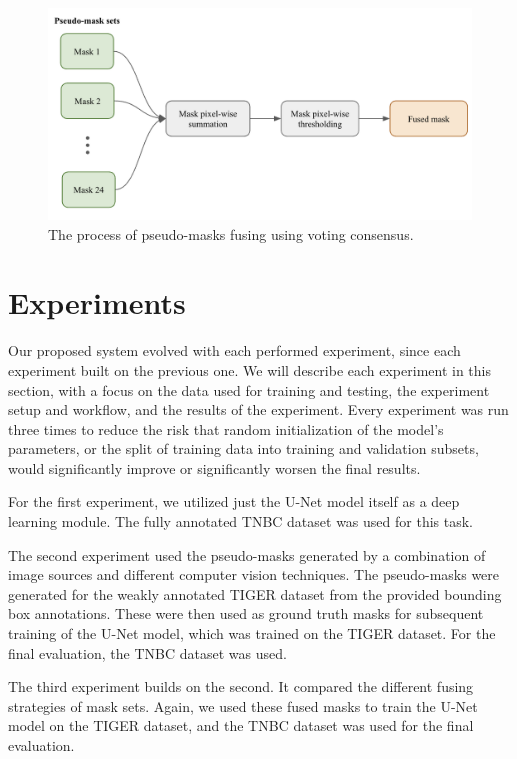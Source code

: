 \begin{figure}[H]
\begin{centering}
\includegraphics[width=\textwidth]{assets/images/for_presentation/dg-mask-fuse-1.png}
\par\end{centering}
\caption{The process of pseudo-masks fusing using voting consensus. 
\label{fig:dg-mask-fuse-1}}
\end{figure}

\section{Experiments}
\label{section:experiments}
Our proposed system evolved with each performed experiment, since each experiment built on the previous one. We will describe each experiment in this section, with a focus on the data used for training and testing, the experiment setup and workflow, and the results of the experiment. Every experiment was run three times to reduce the risk that random initialization of the model's parameters, or the split of training data into training and validation subsets, would significantly improve or significantly worsen the final results.

For the first experiment, we utilized just the U-Net model itself as a deep learning module. The fully annotated TNBC dataset was used for this task.

The second experiment used the pseudo-masks generated by a combination of image sources and different computer vision techniques. The pseudo-masks were generated for the weakly annotated TIGER dataset from the provided bounding box annotations. These were then used as ground truth masks for subsequent training of the U-Net model, which was trained on the TIGER dataset. For the final evaluation, the TNBC dataset was used.

The third experiment builds on the second. It compared the different fusing strategies of mask sets. Again, we used these fused masks to train the U-Net model on the TIGER dataset, and the TNBC dataset was used for the final evaluation.

